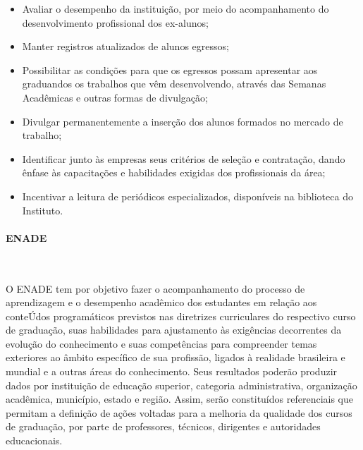 \begin{itemize}
\item Avaliar o desempenho da instituição, por meio do acompanhamento do desenvolvimento profissional dos ex-alunos;

\item Manter registros atualizados de alunos egressos;

\item Possibilitar as condições para que os egressos possam apresentar aos graduandos os trabalhos que vêm desenvolvendo, através das Semanas Acadêmicas e outras formas de divulgação;

\item Divulgar permanentemente a inserção dos alunos formados no mercado de trabalho;

\item Identificar junto às empresas seus critérios de seleção e contratação, dando ênfase às capacitações e habilidades exigidas dos profissionais da área;

\item Incentivar a leitura de periódicos especializados, disponíveis na biblioteca do Instituto.
\end{itemize}

\paragraph{ENADE}\

  O ENADE tem por objetivo fazer o acompanhamento do processo de aprendizagem e o desempenho acadêmico dos estudantes em relação aos conteÚdos programáticos previstos nas diretrizes curriculares do respectivo curso de graduação, suas habilidades para ajustamento às exigências decorrentes da evolução do conhecimento e suas competências para compreender temas exteriores ao âmbito específico de sua profissão, ligados à realidade brasileira e mundial e a outras áreas do conhecimento. Seus resultados poderão produzir dados por instituição de educação superior, categoria administrativa, organização acadêmica, município, estado e região. Assim, serão constituídos referenciais que permitam a definição de ações voltadas para a melhoria da qualidade dos cursos de graduação, por parte de professores, técnicos, dirigentes e autoridades educacionais. 



